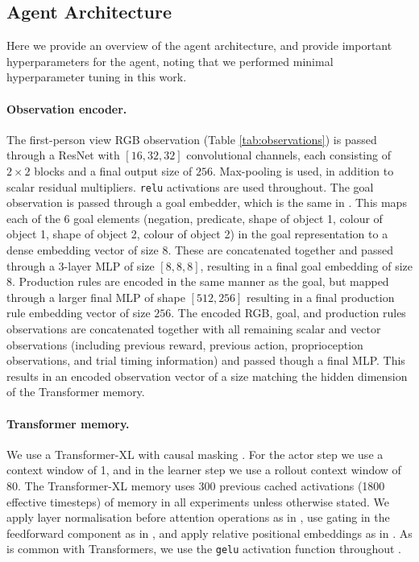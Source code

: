 \documentclass[11pt, a4paper, logo, copyright]{deepmind}
\begin{document}
\begin{appendix}
\subsection{Agent Architecture}
\label{app:agent-architecture}
Here we provide an overview of the agent architecture, and provide important hyperparameters for the agent, noting that we performed minimal hyperparameter tuning in this work.
\paragraph{Observation encoder.}
The first-person view RGB observation (Table \ref{tab:observations}) is passed through a ResNet \citep{he2016resnet} with $[16, 32, 32]$ convolutional channels, each consisting of $2\times2$ blocks and a final output size of $256$. Max-pooling is used, in addition to scalar residual multipliers. \texttt{relu} activations are used throughout.
The goal observation is passed through a goal embedder, which is the same in \citet{xland}. This maps each of the 6 goal elements (negation, predicate, shape of object 1, colour of object 1, shape of object 2, colour of object 2) in the goal representation to a dense embedding vector of size 8. These are concatenated together and passed through a 3-layer MLP of size $[8, 8, 8]$, resulting in a final goal embedding of size $8$.
Production rules are encoded in the same manner as the goal, but mapped through a larger final MLP of shape $[512, 256]$ resulting in a final production rule embedding vector of size $256$.
The encoded RGB, goal, and production rules observations are concatenated together with all remaining scalar and vector observations (including previous reward, previous action, proprioception observations, and trial timing information) and passed though a final MLP. This results in an encoded observation vector of a size matching the hidden dimension of the Transformer memory.
\paragraph{Transformer memory.} We use a Transformer-XL with causal masking \citep{dai2019transformer}. For the actor step we use a context window of 1, and in the learner step we use a rollout context window of 80. The Transformer-XL memory uses 300 previous cached activations (1800 effective timesteps) of memory in all experiments unless otherwise stated. We apply layer normalisation before attention operations as in \citet{parisotto2020stabilizing}, use gating in the feedforward component as in \citet{shazeer2020glu}, and apply relative positional embeddings as in \citet{dai2019transformer}. As is common with Transformers, we use the \texttt{gelu} activation function throughout \citep{hendrycks2016GaussianEL}.

\end{appendix}
\end{document}
